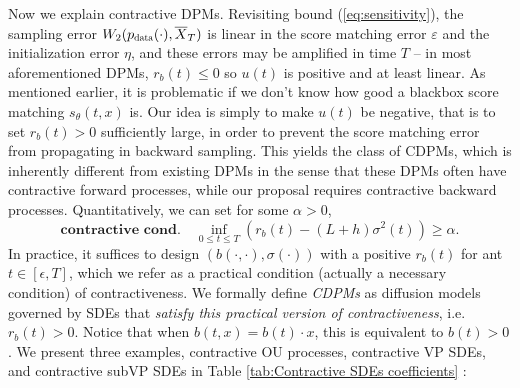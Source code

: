 \documentclass[letterpaper,10pt,reqno]{amsart}
\def\eqref#1{(\ref{#1})}
\numberwithin{equation}{section}
\begin{document}
\quad Now we explain contractive DPMs. 
Revisiting bound \eqref{eq:sensitivity}, 
the sampling error $W_2(p_{\scalebox{0.7}{data}}(\cdot), \overline{X}_T)$
is linear in the score matching error $\varepsilon$
and the initialization error $\eta$,
and these errors may be amplified in time $T$
-- in most aforementioned DPMs, 
$r_b(t) \le 0$ so $u(t)$ is positive and at least linear.
As mentioned earlier,
it is problematic 
if we don't know how good a blackbox score matching $s_\theta(t,x)$ is.
Our idea is simply
 to make $u(t)$ be negative, that is to set $r_b(t) > 0$ sufficiently large, 
in order to prevent the score matching error from propagating in backward sampling.
This yields the class of CDPMs,
which is inherently different from existing DPMs in the sense that
these DPMs often have contractive forward processes,
while our proposal requires contractive backward processes.
Quantitatively, we can set for some $\alpha > 0$,
\begin{equation}
\label{eq:contra1}
\textbf{contractive cond.} \quad \inf_{0 \le t \le T} \left(r_b(t) - (L + h) \sigma^2(t) \right) \ge \alpha.
\end{equation} 
In practice, it suffices to design $(b(\cdot, \cdot), \sigma(\cdot))$ with a positive $r_b(t)$ for ant $t\in [\epsilon,T]$, which we refer as a practical condition (actually a necessary condition) of contractiveness. We formally define {\it CDPMs} as diffusion models governed by SDEs that {\it satisfy this practical version of contractiveness}, i.e. $r_b(t)> 0$. Notice that when $b(t,x)=b(t)\cdot x$, this is equivalent to $b(t)>0$.
We present three examples, contractive OU processes, contractive VP SDEs, and contractive subVP SDEs in Table \ref{tab:Contractive SDEs coefficients} :
\end{document}
